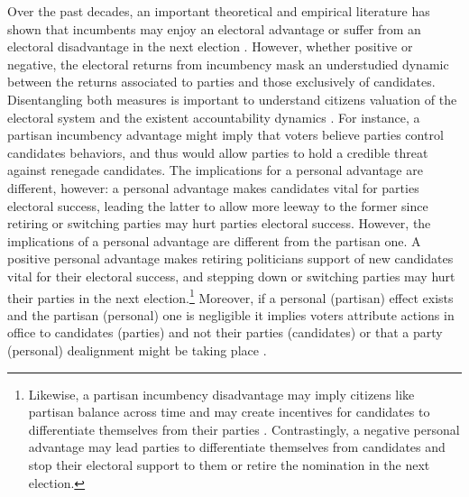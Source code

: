 \documentclass[12pt]{amsart}
\numberwithin{equation}{section}
\theoremstyle{definition}
\theoremstyle{definition}
\theoremstyle{definition}
\begin{document}
Over the past decades, an important theoretical and empirical literature has shown that incumbents may enjoy an electoral advantage \citep{ashworth_2012, cox_morgensten_1993, cox_katz_1996, ansolabehere_snyder_2000, ashworth_bdm_2008, ashworth_etal_2019} or suffer from an electoral disadvantage in the next election \citep{klasnja_2015, klasnja_titiunik_2017}. However, whether positive or negative, the electoral returns from incumbency mask an understudied dynamic between the returns associated to parties and those exclusively of candidates. Disentangling both measures is important to understand citizens valuation of the electoral system and the existent accountability dynamics \citep{mayhew_1974, fowler_hall_2014}. For instance, a partisan incumbency advantage might imply that voters believe parties control candidates behaviors, and thus would allow parties to hold a credible threat against renegade candidates. The implications for a personal advantage are different, however: a personal advantage makes candidates vital for parties electoral success, leading the latter to allow more leeway to the former since retiring or switching parties may hurt parties electoral success. However, the implications of a personal advantage are different from the partisan one. A positive personal advantage makes retiring politicians support of new candidates vital for their electoral success, and stepping down or switching parties may hurt their parties in the next election.\footnote{Likewise, a partisan incumbency disadvantage may imply citizens like partisan balance across time and may create incentives for candidates to differentiate themselves from their parties \citep{klasnja_titiunik_2017}. Contrastingly, a negative personal advantage may lead parties to differentiate themselves from candidates and stop their electoral support to them or retire the nomination in the next election.} Moreover, if a personal (partisan) effect exists and the partisan (personal) one is negligible it implies voters attribute actions in office to candidates (parties) and not their parties (candidates) or that a party (personal) dealignment might be taking place \citep{cox_katz_1996}.   
   
\end{document}
